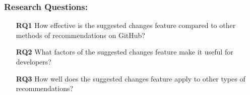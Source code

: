 \subsubsection{Research Questions:}

\begin{itemize}
    \item[\textbf{RQ1}] How effective is the suggested changes feature compared to other methods of recommendations on GitHub?
    \item[\textbf{RQ2}] What factors of the suggested changes feature make it useful for developers?
    \item[\textbf{RQ3}] How well does the suggested changes feature apply to other types of recommendations?
\end{itemize}

